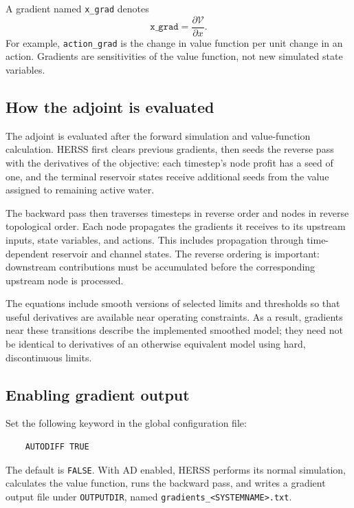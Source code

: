 \documentclass[a4paper, 12pt]{report}
\begin{document}
A gradient named \texttt{x\_grad} denotes
\begin{equation}
	\texttt{x\_grad} = \frac{\partial \mathcal{V}}{\partial x}.
\end{equation}
For example, \texttt{action\_grad} is the change in value function per unit
change in an action. Gradients are sensitivities of the value function, not
new simulated state variables.

\subsection{How the adjoint is evaluated}

The adjoint is evaluated after the forward simulation and value-function
calculation. HERSS first clears previous gradients, then seeds the reverse
pass with the derivatives of the objective: each timestep's node profit has
a seed of one, and the terminal reservoir states receive additional seeds
from the value assigned to remaining active water.

The backward pass then traverses timesteps in reverse order and nodes in
reverse topological order. Each node propagates the gradients it receives
to its upstream inputs, state variables, and actions. This includes
propagation through time-dependent reservoir and channel states. The reverse
ordering is important: downstream contributions must be accumulated before
the corresponding upstream node is processed.

The equations include smooth versions of selected limits and thresholds so
that useful derivatives are available near operating constraints. As a
result, gradients near these transitions describe the implemented smoothed
model; they need not be identical to derivatives of an otherwise equivalent
model using hard, discontinuous limits.

\subsection{Enabling gradient output}

Set the following keyword in the global configuration file:
\begin{verbatim}
	AUTODIFF TRUE
\end{verbatim}
The default is \texttt{FALSE}. With AD enabled, HERSS performs its normal
simulation, calculates the value function, runs the backward pass, and writes
a gradient output file under \texttt{OUTPUTDIR}, named
\texttt{gradients\_<SYSTEMNAME>.txt}.
\end{document}

